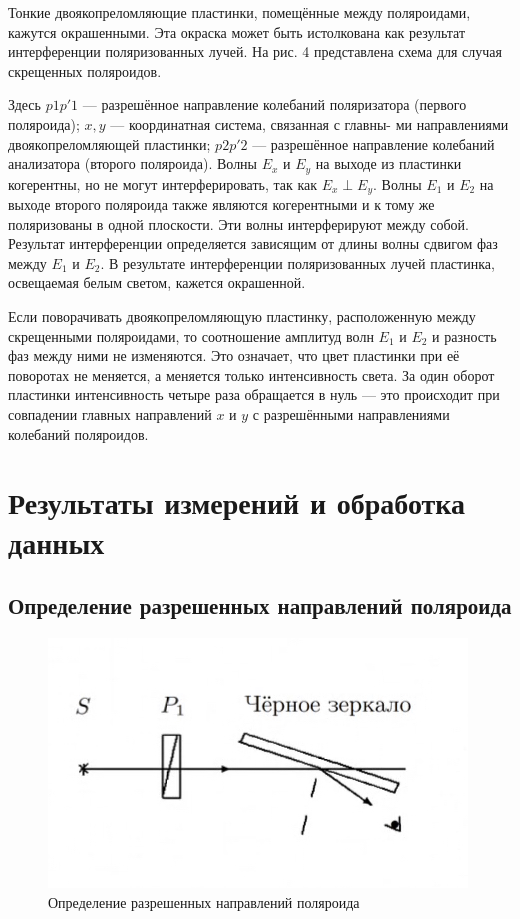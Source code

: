 Тонкие двоякопреломляющие пластинки, помещённые между поляроидами, кажутся окрашенными. Эта окраска может быть истолкована как результат интерференции поляризованных лучей. На рис. 4 представлена схема для
случая скрещенных поляроидов.

Здесь $ p1p'1 $ --- разрешённое направление колебаний поляризатора
(первого поляроида); $ x, y $ --- координатная система, связанная с главны-
ми направлениями двоякопреломляющей пластинки; $ p2p'2 $ --- разрешённое направление колебаний анализатора (второго поляроида). Волны
$ E_x  $ и $ E_y $ на выходе из пластинки когерентны, но не могут интерферировать, так как $ E_x \perp  E_y $. Волны $ E_1 $ и $ E_2 $ на выходе второго поляроида
также являются когерентными и к тому же поляризованы в одной плоскости. Эти волны интерферируют между собой. Результат интерференции определяется зависящим от длины волны сдвигом фаз между $ E_1 $
и $ E_2 $. В результате интерференции поляризованных лучей пластинка, освещаемая белым светом, кажется окрашенной.

Если поворачивать двоякопреломляющую пластинку, расположенную между
скрещенными поляроидами, то соотношение амплитуд волн $ E_1 $ и $ E_2 $ и разность фаз между ними не изменяются. Это означает, что цвет пластинки при её поворотах не меняется, а меняется только интенсивность света. За один оборот пластинки интенсивность четыре раза обращается в нуль --- это происходит при совпадении главных направлений
$ x $ и $ y $ с разрешёнными направлениями колебаний поляроидов.


\section{Результаты измерений и обработка данных}

\subsection{Определение разрешенных направлений поляроида}

\begin{figure}
	\includegraphics[width=\linewidth]{5}
	\caption{Определение разрешенных направлений поляроида}
	\label{ris 5}
\end{figure}

